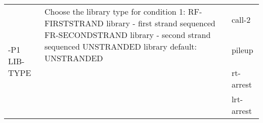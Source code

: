 {\small
\begin{tabular}{@{}p{}p{}l@{}}
\multirow{4}{=}{-P1 LIB-TYPE} & \multirow{2}{=}{Choose the library type for condition 1:
RF-FIRSTSTRAND	library - first strand sequenced
FR-SECONDSTRAND	library - second strand sequenced
UNSTRANDED	library
default: UNSTRANDED} & call-2 \\
 & & pileup \\
 & & rt-arrest \\
 & & lrt-arrest \\
\end{tabular}\\
}
